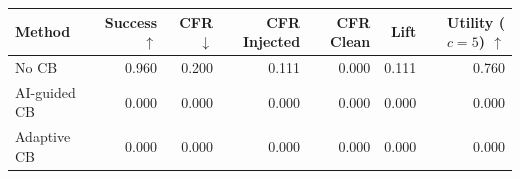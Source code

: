 \begin{tabular}{lrrrrrr}
\toprule
Method & Success $\uparrow$ & CFR $\downarrow$ & CFR Injected & CFR Clean & Lift & Utility ($c=5$) $\uparrow$ \\
\midrule
No CB & 0.960 & 0.200 & 0.111 & 0.000 & 0.111 & 0.760 \\
AI-guided CB & 0.000 & 0.000 & 0.000 & 0.000 & 0.000 & 0.000 \\
Adaptive CB & 0.000 & 0.000 & 0.000 & 0.000 & 0.000 & 0.000 \\
\bottomrule
\end{tabular}
